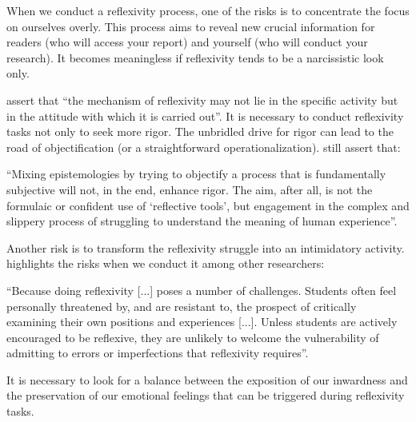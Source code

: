 When we conduct a reflexivity process, one of the risks is to concentrate the focus on ourselves overly. This process aims to reveal new crucial information for readers (who will access your report) and yourself (who will conduct your research). It becomes meaningless if reflexivity tends to be a narcissistic look only.

 assert that “the mechanism of reflexivity may not lie in the specific activity but in the attitude with which it is carried out”. It is necessary to conduct reflexivity tasks not only to seek more rigor. The unbridled drive for rigor can lead to the road of objectification (or a straightforward operationalization).  still assert that:
\begin{citacao}
    “Mixing epistemologies by trying to objectify a process that is fundamentally subjective will not, in the end, enhance rigor. The aim, after all, is not the formulaic or confident use of ‘reflective tools’, but engagement in the complex and slippery process of struggling to understand the meaning of human experience”.
\end{citacao}

Another risk is to transform the reflexivity struggle into an intimidatory activity. \cite[p.~212]{hsiung:2008} highlights the risks when we conduct it among other researchers:
\begin{citacao}
    “Because doing reflexivity [...] poses a number of challenges. Students often feel personally threatened by, and are resistant to, the prospect of critically examining their own positions and experiences [...]. Unless students are actively encouraged to be reflexive, they are unlikely to welcome the vulnerability of admitting to errors or imperfections that reflexivity requires”.
\end{citacao}
It is necessary to look for a balance between the exposition of our inwardness and the preservation of our emotional feelings that can be triggered during reflexivity tasks.
